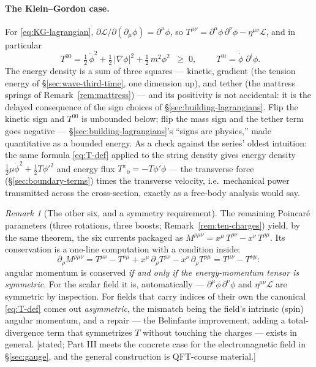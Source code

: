 \documentclass[11pt]{article}
\theoremstyle{plain}
\theoremstyle{definition}
\theoremstyle{remark}
\newtheorem{remark}[theorem]{Remark}
\begin{document}
\paragraph{The Klein--Gordon case.} For
\eqref{eq:KG-lagrangian}, $\partial\mathcal L/\partial(\partial_\mu\phi)
= \partial^\mu\phi$, so
$T^{\mu\nu} = \partial^\mu\phi\,\partial^\nu\phi - \eta^{\mu\nu}
\mathcal L$, and in particular
\begin{equation}
  \boxed{\;
  T^{00}
  = \tfrac12\,\dot\phi^2
  + \tfrac12\,|\nabla\phi|^2
  + \tfrac12\,m^2\phi^2
  \;\;\ge\; 0,
  \;}
  \qquad
  T^{0i} = \dot\phi\;\partial^i\phi .
  \label{eq:KG-T00}
\end{equation}
The energy density is a sum of three squares --- kinetic, gradient
(the tension energy of \S\ref{sec:wave-third-time}, one dimension up),
and tether (the mattress springs of Remark~\ref{rem:mattress}) ---
and its positivity is not accidental: it is the delayed consequence
of the sign choices of \S\ref{sec:building-lagrangians}. Flip the
kinetic sign and $T^{00}$ is unbounded below; flip the mass sign and
the tether term goes negative --- \S\ref{sec:building-lagrangians}'s
``signs are physics,'' made quantitative as a bounded energy. As a check against the series' oldest intuition: the same
formula \eqref{eq:T-def} applied to the string density gives energy
density $\tfrac12\mu\dot\phi^2 + \tfrac12 T\phi'^2$ and energy flux
$T^{x}{}_{0} = -T\phi'\dot\phi$ --- the transverse force
(\S\ref{sec:boundary-terms}) times the transverse velocity, i.e.\
mechanical power transmitted across the cross-section, exactly as a
free-body analysis would say.

\begin{remark}[The other six, and a symmetry requirement]
\label{rem:angular-momentum-fields}
The remaining Poincar\'e parameters (three rotations, three boosts;
Remark~\ref{rem:ten-charges}) yield, by the same theorem, the six
currents packaged as
$M^{\rho\mu\nu} = x^\mu\,T^{\rho\nu} - x^\nu\,T^{\rho\mu}$. Its
conservation is a one-line computation with a condition inside:
\begin{equation}
  \partial_\rho M^{\rho\mu\nu}
  = T^{\mu\nu} - T^{\nu\mu}
  + x^\mu\,\partial_\rho T^{\rho\nu}
  - x^\nu\,\partial_\rho T^{\rho\mu}
  = T^{\mu\nu} - T^{\nu\mu} :
\end{equation}
angular momentum is conserved \emph{if and only if the
energy-momentum tensor is symmetric}. For the scalar field it is,
automatically --- $\partial^\mu\phi\,\partial^\nu\phi$ and
$\eta^{\mu\nu}\mathcal L$ are symmetric by inspection. For fields
that carry indices of their own the canonical \eqref{eq:T-def} comes
out \emph{asymmetric}, the mismatch being the field's intrinsic
(spin) angular momentum, and a repair --- the Belinfante improvement,
adding a total-divergence term that symmetrizes $T$ without touching
the charges --- exists in general. [stated; Part III meets the
concrete case for the electromagnetic field in \S\ref{sec:gauge}, and
the general construction is QFT-course material.]
\end{remark}
\end{document}
